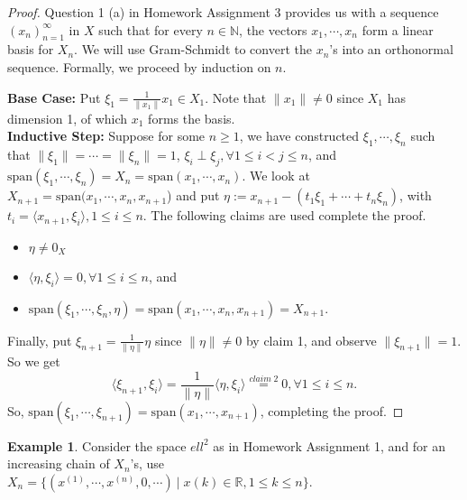 \documentclass[11pt]{amsart}
\theoremstyle{definition}
\newtheorem{example}[theorem]{Example}
\numberwithin{equation}{section}
\newcommand{\bN}{ \mathbb{N} }	%
\newcommand{\bR}{ \mathbb{R} }	%
\newcommand{ \sspan }{ \mbox{span} }						%
\newcommand{ \seq }{ (x_n)_{n=1}^\infty }						%
\begin{document}
\begin{proof}
Question 1 (a) in Homework Assignment 3 provides us with a sequence $\seq$ in $X$ such that for every $n \in \bN$, the vectors $x_1, \cdots, x_n$ form a linear basis for $X_n$. We will use Gram-Schmidt to convert the $x_n$'s into an orthonormal sequence. Formally, we proceed by induction on $n$. 

\newpage

\noindent\textbf{Base Case:} Put $\xi_1 = \frac 1 {\|x_1\|} x_1 \in X_1$. Note that $\|x_1\| \not = 0$ since $X_1$ has dimension 1, of which $x_1$ forms the basis. \\

\noindent \textbf{Inductive Step:} Suppose for some $n \ge 1$, we have constructed $\xi_1, \cdots, \xi_n$ such that $\|\xi_1\|=\cdots = \|\xi_n\| = 1$, $\xi_i \perp \xi_j, \forall 1 \le i < j \le n$, and $\sspan(\xi_1, \cdots, \xi_n) = X_n = \sspan(x_1, \cdots, x_n)$. We look at $X_{n+1} = \sspan(x_1, \cdots, x_n, x_{n+1}$) and put $\eta := x_{n+1} - (t_1\xi_1 + \cdots + t_n\xi_n)$, with $t_i = \langle x_{n+1},\xi_i\rangle, 1\le i \le n$. The following claims are used complete the proof. 
\begin{itemize}
\item $\eta \not = 0_X$
\item $\langle \eta, \xi_i \rangle = 0, \forall 1 \le i \le n$, and
\item $\sspan(\xi_1, \cdots, \xi_n, \eta) = \sspan(x_1, \cdots, x_n, x_{n+1}) = X_{n+1}$. \\
\end{itemize}

\noindent Finally, put $\xi_{n+1} = \frac 1 {\|\eta\|} \eta$ since $\|\eta\| \not = 0$ by claim 1, and observe $\|\xi_{n+1}\| = 1$. So we get 
\[ \langle \xi_{n+1}, \xi_i \rangle = \frac 1 {\|\eta\|} \langle \eta, \xi_i \rangle \overset{claim \; 2}= 0, \forall 1 \le i \le n.\]
So, $\sspan(\xi_1, \cdots, \xi_{n+1}) = \sspan(x_1, \cdots, x_{n+1})$, completing the proof. 
\end{proof}

\vspace{6pt}

\begin{example}\label{ex:45}
Consider the space $ell^2$ as in Homework Assignment 1, and for an increasing chain of $X_n$'s, use $X_n = \{(x^{(1)}, \cdots, x^{(n)}, 0, \cdots) \: | \; x{(k)} \in \bR, 1 \le k \le n \}$. 
\end{example}

\vspace{6pt}
\end{document}
